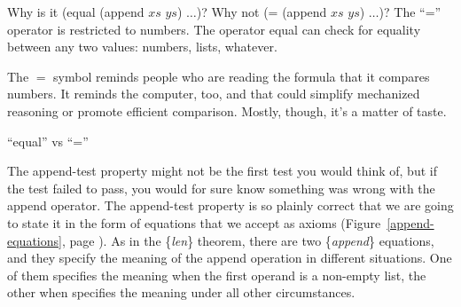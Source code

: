 \begin{aside}
Why is it \textsf{(equal (append $xs$ $ys$) $\dots$)}?
Why not \textsf{(= (append $xs$ $ys$) $\dots$)}?
The ``\textsf{=}'' operator
is restricted to numbers. The operator \textsf{equal} can check
for equality between any two values: numbers, lists, whatever.

The $=$ symbol reminds people who are
reading the formula that it compares numbers.
It reminds the computer, too, and that could
simplify mechanized reasoning or
promote efficient comparison.
Mostly, though, it's a matter of taste.
\caption{``\textsf{equal}'' vs ``\textsf{=}''}
\label{equal}
\end{aside}

The append-test property might not be the first test you would think of,
but if the test failed to pass,
you would for sure know something was wrong with the \textsf{append} operator.
The append-test property is so plainly correct that
we are going to state it in the form of equations that we accept as axioms
(Figure~\ref{append-equations}, page \pageref{append-equations}).
As in the \{\emph{len}\} theorem, there are two \{\emph{append}\} equations,
and they specify the meaning of the append operation in different situations.
One of them specifies the meaning when the first operand is a non-empty list,
the other when specifies the meaning under all other circumstances.

